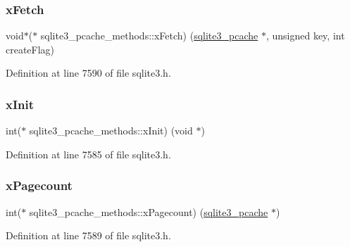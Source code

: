 \subsubsection{\texorpdfstring{x\+Fetch}{xFetch}}
{\footnotesize\ttfamily void$\ast$($\ast$ sqlite3\+\_\+pcache\+\_\+methods\+::x\+Fetch) (\mbox{\hyperlink{sqlite3_8h_a096c453d937d51f7926d7d31c8e0bd2f}{sqlite3\+\_\+pcache}} $\ast$, unsigned key, int create\+Flag)}



Definition at line 7590 of file sqlite3.\+h.

\mbox{\label{structsqlite3__pcache__methods_ac75d3dbf840e6f05ea08d35ad0457fb2}} 
\subsubsection{\texorpdfstring{x\+Init}{xInit}}
{\footnotesize\ttfamily int($\ast$ sqlite3\+\_\+pcache\+\_\+methods\+::x\+Init) (void $\ast$)}



Definition at line 7585 of file sqlite3.\+h.

\mbox{\label{structsqlite3__pcache__methods_a1e0895008a701c1843336f0e0dcd3f46}} 
\subsubsection{\texorpdfstring{x\+Pagecount}{xPagecount}}
{\footnotesize\ttfamily int($\ast$ sqlite3\+\_\+pcache\+\_\+methods\+::x\+Pagecount) (\mbox{\hyperlink{sqlite3_8h_a096c453d937d51f7926d7d31c8e0bd2f}{sqlite3\+\_\+pcache}} $\ast$)}



Definition at line 7589 of file sqlite3.\+h.

\mbox{\label{structsqlite3__pcache__methods_a0d8a7a980e22e908429a181f8fc7733e}} 
